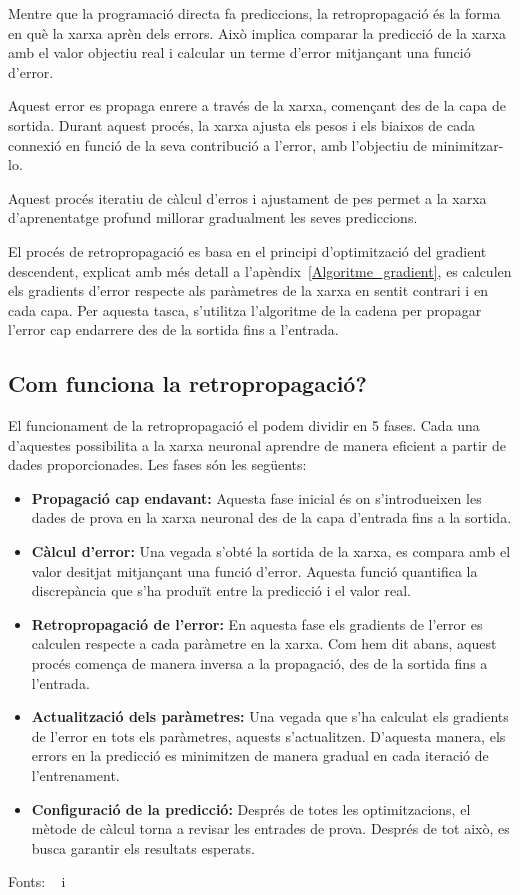 Mentre que la programació directa fa prediccions, la retropropagació és la forma en què la xarxa aprèn dels errors. Això implica comparar la predicció de la xarxa amb el valor objectiu real i calcular un terme d'error mitjançant una funció d'error.

Aquest error es propaga enrere a través de la xarxa, començant des de la capa de sortida. Durant aquest procés, la xarxa ajusta els pesos i els biaixos de cada connexió en funció de la seva contribució a l'error, amb l'objectiu de minimitzar-lo.

Aquest procés iteratiu de càlcul d'erros i ajustament de pes permet a la xarxa d'aprenentatge profund millorar gradualment les seves prediccions.

El procés de retropropagació es basa en el principi d'optimització del gradient descendent, explicat amb més detall a l'apèndix~\ref{Algoritme_gradient}, es calculen els gradients d'error respecte als paràmetres de la xarxa en sentit contrari i en cada capa. Per aquesta tasca, s'utilitza l'algoritme de la cadena per propagar l'error cap endarrere des de la sortida fins a l'entrada.

\subsection{Com funciona la retropropagació?}

El funcionament de la retropropagació el podem dividir en 5 fases. Cada una d'aquestes possibilita a la xarxa neuronal aprendre de manera eficient a partir de dades proporcionades. Les fases són les següents:

\begin{itemize}
    \item \textbf{Propagació cap endavant:} Aquesta fase inicial és on s'introdueixen les dades de prova en la xarxa neuronal des de la capa d'entrada fins a la sortida.

    \item \textbf{Càlcul d'error:} Una vegada s'obté la sortida de la xarxa, es compara amb el valor desitjat mitjançant una funció d'error. Aquesta funció quantifica la discrepància que s'ha produït entre la predicció i el valor real.

    \item \textbf{Retropropagació de l'error:} En aquesta fase els gradients de l'error es calculen respecte a cada paràmetre en la xarxa. Com hem dit abans, aquest procés comença de manera inversa a la propagació, des de la sortida fins a l'entrada.

    \item \textbf{Actualització dels paràmetres:} Una vegada que s'ha calculat els gradients de l'error en tots els paràmetres, aquests s'actualitzen. D'aquesta manera, els errors en la predicció es minimitzen de manera gradual en cada iteració de l'entrenament.

    \item \textbf{Configuració de la predicció:} Després de totes les optimitzacions, el mètode de càlcul torna a revisar les entrades de prova. Després de tot això, es busca garantir els resultats esperats.
\end{itemize}

Fonts: ~\cite{valencia} i~\cite{Retropropagacio}
